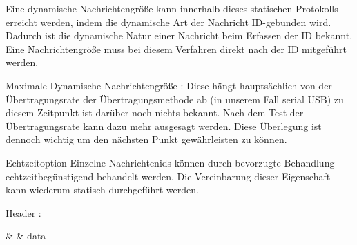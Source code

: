 Eine dynamische Nachrichtengröße kann innerhalb dieses statischen Protokolls erreicht werden, indem die dynamische Art der Nachricht ID-gebunden wird. Dadurch ist die dynamische Natur einer Nachricht beim Erfassen der ID bekannt. Eine Nachrichtengröße muss bei diesem Verfahren direkt nach der ID mitgeführt werden.

Maximale Dynamische Nachrichtengröße : Diese hängt hauptsächlich von der Übertragungsrate der Übertragungsmethode ab (in unserem Fall serial USB) zu diesem Zeitpunkt ist darüber noch nichts bekannt. Nach dem Test der Übertragungsrate kann dazu mehr ausgesagt werden. Diese Überlegung ist dennoch wichtig um den nächsten Punkt gewährleisten zu können.

\Large Echtzeitoption
\normalsize
Einzelne Nachrichtenids können durch bevorzugte Behandlung echtzeitbegünstigend behandelt werden. Die Vereinbarung dieser Eigenschaft kann wiederum statisch durchgeführt werden.

\LARGE Header :
\normalsize
\begin{itemize}

\begin{bytefield}[bitwidth=1.1em][32]
	 &  &  {data}
\end{bytefield}

\end{itemize}

